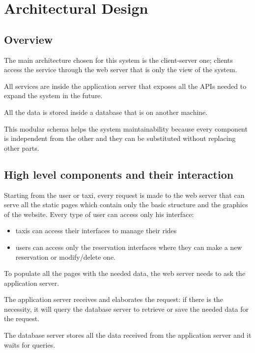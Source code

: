 \section{Architectural Design}
\subsection{Overview}
	The main architecture chosen for this system is the client-server one; clients access the service through the web server that is only the view of the system. 
	
	All services are inside the application server that exposes all the APIs needed to expand the system in the future.
	
	All the data is stored inside a database that is on another machine.

	This modular schema helps the system maintainability because every component is independent from the other and they can be substituted without replacing other parts. 
\subsection{High level components and their interaction}
	Starting from the user or taxi, every request is made to the web server that can serve all the static pages which contain only the basic structure and the graphics of the website. Every type of user can access only his interface:
	\begin{itemize} 
		\item taxis can access their interfaces to manage their rides 
		\item users can access only the reservation interfaces where they can make a new reservation or modify/delete one.
	\end{itemize}
	To populate all the pages with the needed data, the web server needs to ask the application server.
	
	The application server receives and elaborates the request: if there is the necessity, it will query the database server to retrieve or save the needed data for the request.
	
	The database server stores all the data received from the application server and it waits for queries.
